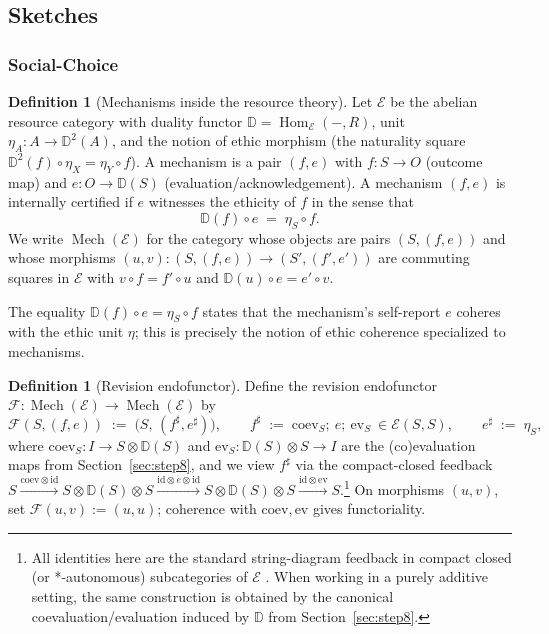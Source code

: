\documentclass[12pt]{article}
\DeclareMathOperator{\Mech}{Mech}
\newcommand{\E}{\mathcal{E}}
\newcommand{\DD}{\mathbb{D}}
\newcommand{\Hom}{\operatorname{Hom}}
\newcommand{\id}{\mathrm{id}}
\newcommand{\coev}{\mathrm{coev}}
\newcommand{\ev}{\mathrm{ev}}
\theoremstyle{plain}
\theoremstyle{definition}
\newtheorem{definition}[theorem]{Definition}
\theoremstyle{remark}
\numberwithin{equation}{section}
\begin{document}
\subsection{Sketches}

\subsubsection{Social-Choice}\label{subsec:econ-ethic-fixpoint}

\begin{definition}[Mechanisms inside the resource theory]
Let $\E$ be the abelian resource category with duality functor $\DD=\Hom_{\E}(-,R)$, unit $\eta_A:A\to \DD^2(A)$, and the notion of ethic morphism (the naturality square $\DD^2(f)\circ \eta_X=\eta_Y\circ f$). 
A mechanism is a pair $(f,e)$ with $f:S\to O$ (outcome map) and $e:O\to \DD(S)$ (evaluation/acknowledgement). A mechanism $(f,e)$ is internally certified if $e$ witnesses the ethicity of $f$ in the sense that
\[
\DD(f)\circ e \;=\; \eta_S\circ f.
\]
We write $\Mech(\E)$ for the category whose objects are pairs $(S,(f,e))$ and whose morphisms $(u,v):(S,(f,e))\to(S',(f',e'))$ are commuting squares in $\E$ with $v\circ f=f'\circ u$ and $\DD(u)\circ e=e'\circ v$.
\end{definition}

The equality $\DD(f)\circ e=\eta_S\circ f$ states that the mechanism's self-report $e$ coheres with the ethic unit $\eta$; this is precisely the notion of ethic coherence specialized to mechanisms.

\begin{definition}[Revision endofunctor]
Define the revision endofunctor $\mathcal F:\Mech(\E)\to \Mech(\E)$ by
\[
\mathcal F(S,(f,e)) \;:=\; \bigl(S,\,(f^\sharp,e^\sharp)\bigr),\qquad
f^\sharp \;:=\; \coev_S;\ e;\ \ev_S \ \in \E(S,S),\qquad
e^\sharp \;:=\; \eta_S,
\]
where $\coev_S:I\to S\otimes \DD(S)$ and $\ev_S:\DD(S)\otimes S\to I$ are the (co)evaluation maps from Section~\ref{sec:step8}, and we view $f^\sharp$ via the compact-closed feedback $S \xrightarrow{\coev\otimes \id} S\otimes \DD(S)\otimes S \xrightarrow{\id\otimes e\otimes \id} S\otimes \DD(S)\otimes S \xrightarrow{\id\otimes \ev} S$.\footnote{All identities here are the standard string-diagram feedback in compact closed (or *-autonomous) subcategories of $\E$ \cite{Kelly1982,Barr1979}. When working in a purely additive setting, the same construction is obtained by the canonical coevaluation/evaluation induced by $\DD$ from Section~\ref{sec:step8}.}
On morphisms $(u,v)$, set $\mathcal F(u,v):=(u,u)$; coherence with $\coev,\ev$ gives functoriality.
\end{definition}
\end{document}
